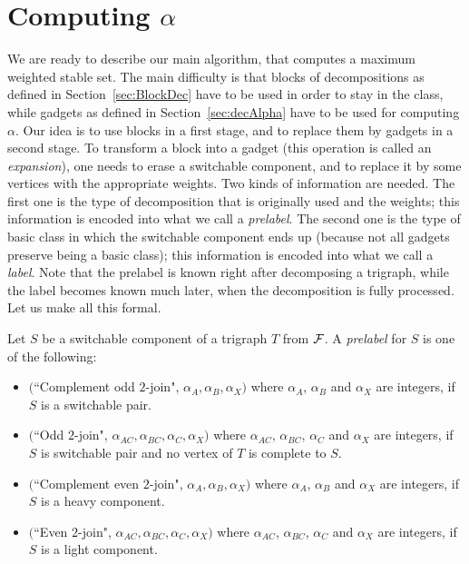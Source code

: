 \documentclass[11 pt] {article}
\begin{document}
\section{Computing $\alpha$}
\label{sec:computeAlpha}

We are ready to describe our main algorithm, that computes a maximum
weighted stable set.  The main difficulty is that blocks of
decompositions as defined in Section~\ref{sec:BlockDec} have to be used
in order to stay in the class, while gadgets as defined in
Section~\ref{sec:decAlpha} have to be used for computing $\alpha$.
Our idea is to use blocks in a first stage, and to replace them by
gadgets in a second stage.  To transform a block into a gadget (this
operation is called an \emph{expansion}), one needs to erase a
switchable component, and to replace it by some vertices with the
appropriate weights.  Two kinds of information are needed.  The first
one is the type of decomposition that is originally used and the
weights; this information is encoded into what we call a
\emph{prelabel}.  The second one is the type of basic class in which
the switchable component ends up (because not all gadgets preserve
being a basic class); this information is encoded into what we call a
\emph{label}.  Note that the prelabel is known right after decomposing
a trigraph, while the label becomes known much later, when the
decomposition is fully processed.  Let us make all this formal.

Let $S$ be a switchable component of a trigraph $T$ from $\cal F$.  A
\emph{prelabel} for $S$ is one of the following: 

\begin{itemize}
\item $($``Complement odd $2$-join", $\alpha_A, \alpha_B, \alpha_X)$
  where $\alpha_A$, $\alpha_B$ and $\alpha_X$ are integers, if $S$ is
  a switchable pair.

\item  $($``Odd $2$-join", $\alpha_{AC},
  \alpha_{BC}, \alpha_C, \alpha_X)$ where $\alpha_{AC}$,
  $\alpha_{BC}$, $\alpha_C$ and $\alpha_X$ are integers,
if $S$ is switchable pair and no vertex of $T$ is complete to $S$.

\item  $($``Complement even $2$-join", $\alpha_A, \alpha_B, \alpha_X)$ where
  $\alpha_A$, $\alpha_B$ and $\alpha_X$ are integers, if $S$ is a heavy 
  component.

\item $($``Even $2$-join",
  $\alpha_{AC}, \alpha_{BC}, \alpha_C, \alpha_X)$ where $\alpha_{AC}$,
  $\alpha_{BC}$, $\alpha_C$ and $\alpha_X$ are integers, if $S$ is a light 
  component.

\end{itemize} 
\end{document}
